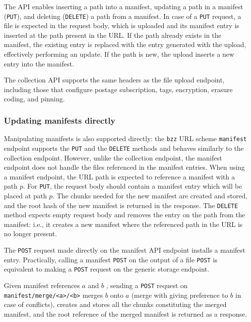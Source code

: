 The API enables inserting a path into a manifest, updating a path in a manifest (\lstinline{PUT}), and deleting (\lstinline{DELETE}) a path from a manifest. In case of a \lstinline{PUT} request, a file is expected in the request body, which is uploaded and its manifest entry is inserted at the path present in the URL. If the path already exists in the manifest, the existing entry is replaced with the entry generated with the upload, effectively performing an update. If the path is new, the upload inserts a new entry into the manifest. 

The collection API supports the same headers as the file upload endpoint, including those that configure postage subscription, tags, encryption, erasure coding, and pinning.

\subsubsection{Updating manifests directly}

Manipulating manifests is also supported directly: the \lstinline{bzz} URL scheme \lstinline{manifest} endpoint supports the \lstinline{PUT} and the \lstinline{DELETE} methods and behaves similarly to the collection endpoint. However, unlike the collection endpoint, the manifest endpoint does not handle the files referenced in the manifest entries. When using a manifest endpoint, the URL path is expected to reference a manifest with a path $p$. For \lstinline{PUT}, the request body should contain a manifest entry which will be placed at path $p$. The chunks needed for the new manifest are created and stored, and the root  hash of the new manifest is returned in the response. The  \lstinline{DELETE} method expects empty request body and removes the entry on the path from the manifest: i.e., it creates a new manifest where the referenced path in the URL is no longer present. 

The \lstinline{POST} request made directly on the manifest API endpoint installs a manifest entry. Practically, calling a manifest \lstinline{POST} on the output of a file \lstinline{POST} is equivalent to making a \lstinline{POST} request on the generic storage endpoint.  

Given manifest references $a$ and $b$ , sending a \lstinline{POST} request on \lstinline{manifest/merge/<a>/<b>} 
merges $b$ onto $a$ (merge with giving preference to $b$ in case of conflicts), creates and stores all the chunks constituting the merged manifest, and the root reference of the merged manifest is returned as a response.


